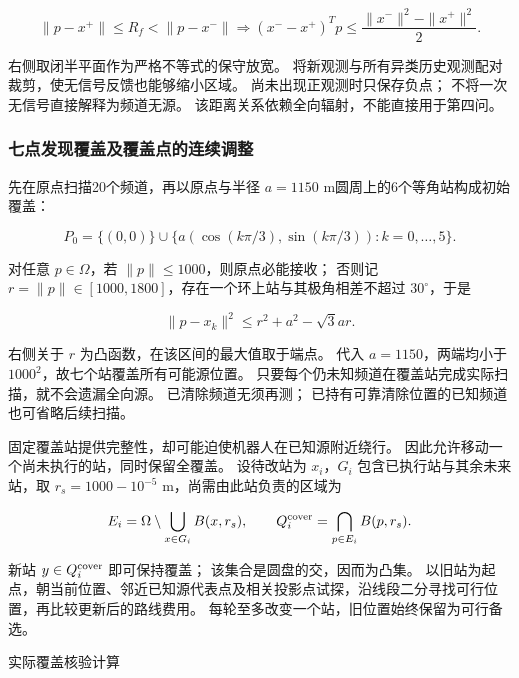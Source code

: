 \documentclass[UTF8,a4paper,zihao=5,fontset=fandol]{ctexart}
\begin{document}
\begin{equation}\label{eq:q3-3}
\|p-x^+\|\le R_f<\|p-x^-\|
\Longrightarrow
(x^--x^+)^Tp\le\frac{\|x^-\|^2-\|x^+\|^2}{2}.
\end{equation}

右侧取闭半平面作为严格不等式的保守放宽。
将新观测与所有异类历史观测配对裁剪，使无信号反馈也能够缩小区域。
尚未出现正观测时只保存负点；
不将一次无信号直接解释为频道无源。
该距离关系依赖全向辐射，不能直接用于第四问。

\subsubsection{七点发现覆盖及覆盖点的连续调整}\label{sec:q3-2}

先在原点扫描20个频道，再以原点与半径 \(a=1150\) m圆周上的6个等角站构成初始覆盖：

\begin{equation}\label{eq:q3-4}
P_0=\{(0,0)\}\cup
\{a(\cos(k\pi/3),\sin(k\pi/3)):k=0,\ldots,5\}.
\end{equation}

对任意 \(p\in\Omega\)，若 \(\|p\|\le1000\)，则原点必能接收；
否则记 \(r=\|p\|\in[1000,1800]\)，存在一个环上站与其极角相差不超过 \(30^\circ\)，于是

\begin{equation}\label{eq:q3-5}
\|p-x_k\|^2\le r^2+a^2-\sqrt3ar.
\end{equation}

右侧关于 \(r\) 为凸函数，在该区间的最大值取于端点。
代入 \(a=1150\)，两端均小于 \(1000^2\)，故七个站覆盖所有可能源位置。
只要每个仍未知频道在覆盖站完成实际扫描，就不会遗漏全向源。
已清除频道无须再测；
已持有可靠清除位置的已知频道也可省略后续扫描。

固定覆盖站提供完整性，却可能迫使机器人在已知源附近绕行。
因此允许移动一个尚未执行的站，同时保留全覆盖。
设待改站为 \(x_i\)，\(G_i\) 包含已执行站与其余未来站，取 \(r_s=1000-10^{-5}\) m，尚需由此站负责的区域为

\begin{equation}\label{eq:q3-6}
E_i=\Omega\setminus\bigcup_{x\in G_i}B(x,r_s),
\qquad Q_i^{\rm cover}=\bigcap_{p\in E_i}B(p,r_s).
\end{equation}

新站 \(y\in Q_i^{\rm cover}\) 即可保持覆盖；
该集合是圆盘的交，因而为凸集。
以旧站为起点，朝当前位置、邻近已知源代表点及相关投影点试探，沿线段二分寻找可行位置，再比较更新后的路线费用。
每轮至多改变一个站，旧位置始终保留为可行备选。

实际覆盖核验计算
\end{document}
